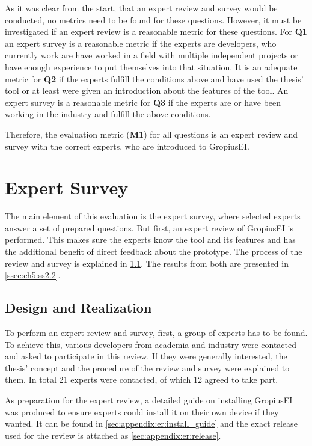 As it was clear from the start, that an expert review and survey would be conducted, no metrics need to be found for these questions.
However, it must be investigated if an expert review is a reasonable metric for these questions.
For \textbf{Q1} an expert survey is a reasonable metric if the experts are developers, who currently work are have worked in a field with multiple independent projects or have enough experience to put themselves into that situation.
It is an adequate metric for \textbf{Q2} if the experts fulfill the conditions above and have used the thesis' tool or at least were given an introduction about the features of the tool.
An expert survey is a reasonable metric for \textbf{Q3} if the experts are or have been working in the industry and fulfill the above conditions.

Therefore, the evaluation metric (\textbf{M1}) for all questions is an expert review and survey with the correct experts, who are introduced to \gls{GropiusEI}. 

\section{Expert Survey}
\label{sec:ch5:s2}
The main element of this evaluation is the expert survey, where selected experts answer a set of prepared questions. 
But first, an expert review of \gls{GropiusEI} is performed.
This makes sure the experts know the tool and its features and has the additional benefit of direct feedback about the prototype.
The process of the review and survey is explained in \cref{ssec:ch5:ss2.1}.
The results from both are presented in \cref{ssec:ch5:ss2.2}.

\subsection{Design and Realization}
\label{ssec:ch5:ss2.1}
To perform an expert review and survey, first, a group of experts has to be found.
To achieve this, various developers from academia and industry were contacted and asked to participate in this review.
If they were generally interested, the thesis' concept and the procedure of the review and survey were explained to them.
In total 21 experts were contacted, of which 12 agreed to take part.

As preparation for the expert review, a detailed guide on installing \gls{GropiusEI} was produced
to ensure experts could install it on their own device if they wanted.
It can be found in \cref{sec:appendix:er:install_guide} and
the exact release used for the review is attached as \cref{sec:appendix:er:release}.

